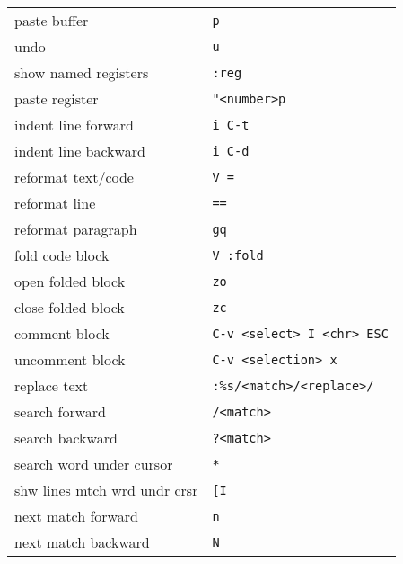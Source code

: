 \documentclass[report,twocolumn]{IEEEtran}
\begin{document}
\begin{center}
\begin{tabular}{ l | l }
paste buffer & \texttt{p} \\
undo & \texttt{u} \\
show named registers & \texttt{:reg} \\
paste register & \texttt{"<number>p} \\
\hline
indent line forward & \texttt{i C-t} \\
indent line backward & \texttt{i C-d} \\
reformat text/code & \texttt{V =} \\
reformat line & \texttt{==} \\
reformat paragraph & \texttt{gq} \\
fold code block & \texttt{V :fold} \\
open folded block & \texttt{zo} \\
close folded block & \texttt{zc} \\
comment block &\texttt{C-v <select> I <chr> ESC} \\
uncomment block & \texttt{C-v <selection> x} \\
replace text & \texttt{:\%s/<match>/<replace>/} \\
\hline
search forward & \texttt{/<match>} \\
search backward & \texttt{?<match>} \\
search word under cursor & \texttt{*} \\
shw lines mtch wrd undr crsr & \texttt{[I} \\
next match forward & \texttt{n} \\
next match backward & \texttt{N} \\
\hline
\end{tabular}
\end{center}
\end{document}

